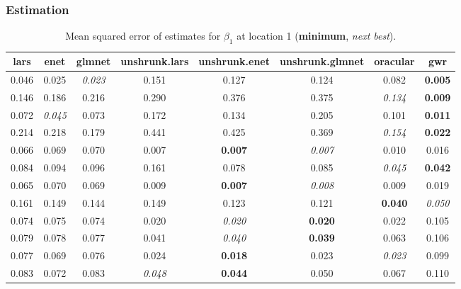 \documentclass[authoryear, review, 11pt]{elsarticle}
\begin{document}
		\subsubsection{Estimation}
		\begin{table}[ht]
		\begin{center}
		\begin{tabular}{cccccccc}
		 lars & enet & glmnet & unshrunk.lars & unshrunk.enet & unshrunk.glmnet & oracular & gwr \\ 
		  \hline
		0.046 & 0.025 & \emph{0.023} & 0.151 & 0.127 & 0.124 & 0.082 & \textbf{0.005} \\ 
		  0.146 & 0.186 & 0.216 & 0.290 & 0.376 & 0.375 & \emph{0.134} & \textbf{0.009} \\ 
		  0.072 & \emph{0.045} & 0.073 & 0.172 & 0.134 & 0.205 & 0.101 & \textbf{0.011} \\ 
		  0.214 & 0.218 & 0.179 & 0.441 & 0.425 & 0.369 & \emph{0.154} & \textbf{0.022} \\ 
		  0.066 & 0.069 & 0.070 & 0.007 & \textbf{0.007} & \emph{0.007} & 0.010 & 0.016 \\ 
		  0.084 & 0.094 & 0.096 & 0.161 & 0.078 & 0.085 & \emph{0.045} & \textbf{0.042} \\ 
		  0.065 & 0.070 & 0.069 & 0.009 & \textbf{0.007} & \emph{0.008} & 0.009 & 0.019 \\ 
		  0.161 & 0.149 & 0.144 & 0.149 & 0.123 & 0.121 & \textbf{0.040} & \emph{0.050} \\ 
		  0.074 & 0.075 & 0.074 & 0.020 & \emph{0.020} & \textbf{0.020} & 0.022 & 0.105 \\ 
		  0.079 & 0.078 & 0.077 & 0.041 & \emph{0.040} & \textbf{0.039} & 0.063 & 0.106 \\ 
		  0.077 & 0.069 & 0.076 & 0.024 & \textbf{0.018} & 0.023 & \emph{0.023} & 0.099 \\ 
		  0.083 & 0.072 & 0.083 & \emph{0.048} & \textbf{0.044} & 0.050 & 0.067 & 0.110 \\ 
		  \end{tabular}
		\caption{Mean squared error of estimates for $\beta_1$ at location 1 (\textbf{minimum}, \emph{next best}).\label{loc1-X1-MSEX}}
		\end{center}
		\end{table}
		
\end{document}
